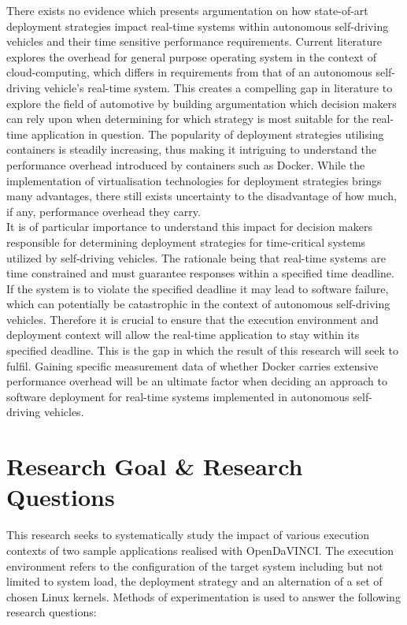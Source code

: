There exists no evidence which presents argumentation on how state-of-art deployment strategies impact real-time systems within autonomous self-driving vehicles and their time sensitive performance requirements. Current literature \cite{p6} explores the overhead for general purpose operating system in the context of cloud-computing, which differs in requirements from that of an autonomous self-driving vehicle's real-time system. This creates a compelling gap in literature to explore the field of automotive by building argumentation which decision makers can rely upon when determining for which strategy is most suitable for the real-time application in question. The popularity of deployment strategies utilising containers is steadily increasing, thus making it intriguing to understand the performance overhead introduced by containers such as Docker. While the implementation of virtualisation technologies for deployment strategies brings many advantages, there still exists uncertainty to the disadvantage of how much, if any, performance overhead they carry.\\

It is of particular importance to understand this impact for decision makers responsible for determining deployment strategies for time-critical systems utilized by self-driving vehicles. The rationale being that real-time systems are time constrained and must guarantee responses within a specified time deadline. If the system is to violate the specified deadline it may lead to software failure, which can potentially be catastrophic in the context of autonomous self-driving vehicles. Therefore it is crucial to ensure that the execution environment and deployment context will allow the real-time application to stay within its specified deadline. This is the gap in which the result of this research will seek to fulfil. Gaining specific measurement data of whether Docker carries extensive performance overhead will be an ultimate factor when deciding an approach to software deployment for real-time systems implemented in autonomous self-driving vehicles.\\

\section{Research Goal \& Research Questions}
This research seeks to systematically study the impact of various execution contexts of two sample applications realised with OpenDaVINCI. The execution environment refers to the configuration of the target system including but not limited to system load, the deployment strategy and an alternation of a set of chosen Linux kernels. Methods of experimentation is used to answer the following research questions:\\

